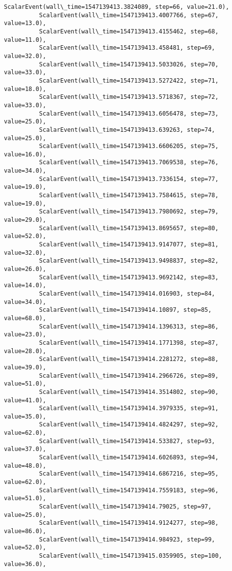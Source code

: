 \documentclass[11pt]{article}
\begin{document}
\begin{Verbatim}[commandchars=\\\{\}]
          ScalarEvent(wall\_time=1547139413.3824089, step=66, value=21.0),
          ScalarEvent(wall\_time=1547139413.4007766, step=67, value=13.0),
          ScalarEvent(wall\_time=1547139413.4155462, step=68, value=11.0),
          ScalarEvent(wall\_time=1547139413.458481, step=69, value=32.0),
          ScalarEvent(wall\_time=1547139413.5033026, step=70, value=33.0),
          ScalarEvent(wall\_time=1547139413.5272422, step=71, value=18.0),
          ScalarEvent(wall\_time=1547139413.5718367, step=72, value=33.0),
          ScalarEvent(wall\_time=1547139413.6056478, step=73, value=25.0),
          ScalarEvent(wall\_time=1547139413.639263, step=74, value=25.0),
          ScalarEvent(wall\_time=1547139413.6606205, step=75, value=16.0),
          ScalarEvent(wall\_time=1547139413.7069538, step=76, value=34.0),
          ScalarEvent(wall\_time=1547139413.7336154, step=77, value=19.0),
          ScalarEvent(wall\_time=1547139413.7584615, step=78, value=19.0),
          ScalarEvent(wall\_time=1547139413.7980692, step=79, value=29.0),
          ScalarEvent(wall\_time=1547139413.8695657, step=80, value=52.0),
          ScalarEvent(wall\_time=1547139413.9147077, step=81, value=32.0),
          ScalarEvent(wall\_time=1547139413.9498837, step=82, value=26.0),
          ScalarEvent(wall\_time=1547139413.9692142, step=83, value=14.0),
          ScalarEvent(wall\_time=1547139414.016903, step=84, value=34.0),
          ScalarEvent(wall\_time=1547139414.10897, step=85, value=68.0),
          ScalarEvent(wall\_time=1547139414.1396313, step=86, value=23.0),
          ScalarEvent(wall\_time=1547139414.1771398, step=87, value=28.0),
          ScalarEvent(wall\_time=1547139414.2281272, step=88, value=39.0),
          ScalarEvent(wall\_time=1547139414.2966726, step=89, value=51.0),
          ScalarEvent(wall\_time=1547139414.3514802, step=90, value=41.0),
          ScalarEvent(wall\_time=1547139414.3979335, step=91, value=35.0),
          ScalarEvent(wall\_time=1547139414.4824297, step=92, value=62.0),
          ScalarEvent(wall\_time=1547139414.533827, step=93, value=37.0),
          ScalarEvent(wall\_time=1547139414.6026893, step=94, value=48.0),
          ScalarEvent(wall\_time=1547139414.6867216, step=95, value=62.0),
          ScalarEvent(wall\_time=1547139414.7559183, step=96, value=51.0),
          ScalarEvent(wall\_time=1547139414.79025, step=97, value=25.0),
          ScalarEvent(wall\_time=1547139414.9124277, step=98, value=86.0),
          ScalarEvent(wall\_time=1547139414.984923, step=99, value=52.0),
          ScalarEvent(wall\_time=1547139415.0359905, step=100, value=36.0),

\end{Verbatim}
\end{document}

